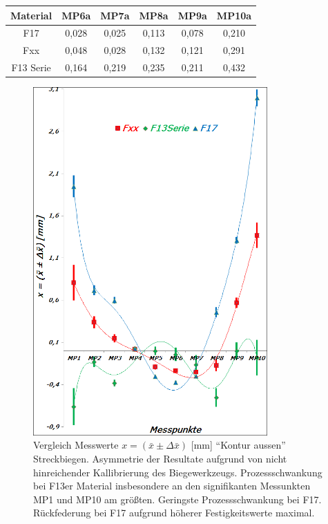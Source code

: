 \documentclass[12pt,a4paper,parskip,twoside,BCOR5mm,headsepline]{scrartcl}
\begin{document}
\begin{table}[hbtp]
\begin{tabular}{cccccc}
  Material    & MP6a & MP7a & MP8a & MP9a & MP10a  \\
  \midrule
    F17 &0,028&0,025&0,113&0,078&0,210\\
 Fxx   &0,048&0,028&0,132&0,121&0,291\\
F13 Serie &0,164&0,219&0,235&0,211&0,432\\ 
   \bottomrule 
         
   \end{tabular} 
\end{table}

\begin{figure}[hbtp] 
\centering
\includegraphics[width=0.8\textwidth]{mitkontausstrckb}
\caption{Vergleich Messwerte $x=(\bar{x} \pm \Delta\bar{x}) $ [mm]  "`Kontur aussen"' Streckbiegen. Asymmetrie der Resultate aufgrund von nicht hinreichender Kallibrierung des Biegewerkzeugs. Prozessschwankung  bei F13er Material insbesondere an den signifikanten Messunkten MP1 und MP10 am größten. Geringste Prozessschwankung bei F17. Rückfederung bei F17 aufgrund höherer Festigkeitswerte maximal.}
\label{fig:mitstrckb}
\end{figure}
\end{document}
